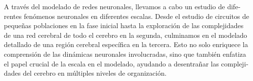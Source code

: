\documentclass[../main.tex]{subfiles}
\begin{document}
\begin{otherlanguage}{spanish}
A través del modelado de redes neuronales, llevamos a cabo un estudio de diferentes fenómenos neuronales en diferentes escalas.
Desde el estudio de circuitos de pequeñas poblaciones en la fase inicial hasta la exploración de las complejidades de una red cerebral de todo el cerebro en la segunda, culminamos en el modelado detallado de una región cerebral específica en la tercera.
Esto no solo enriquece la comprensión de las dinámicas neuronales involucradas, sino que también enfatiza el papel crucial de la escala en el modelado, ayudando a desentrañar las complejidades del cerebro en múltiples niveles de organización.
\end{otherlanguage}

\endgroup
\vfill
\end{document}

